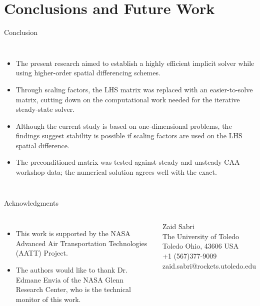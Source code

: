 \section{Conclusions and Future Work}
\begin{frame}{Conclusion}
  \begin{columns}
    \begin{itemize}
      \item The present research aimed to establish a highly efficient implicit solver while
        using higher-order spatial differencing schemes. 
      \item Through scaling factors, the LHS matrix was replaced with an easier-to-solve matrix,
        cutting down on the computational work needed for the iterative steady-state solver. 
      \item Although the current study is based on one-dimensional problems, the findings
        suggest stability is possible if scaling factors are used on the LHS spatial difference.
      \item The preconditioned matrix was tested against steady and unsteady CAA workshop data;
        the numerical solution agrees well with the exact.  
    \end{itemize}
  \end{columns}
\end{frame}

\begin{frame}{Acknowledgments}
  \begin{columns}
        \begin{itemize}
        \item This work is supported by the NASA Advanced Air Transportation Technologies (AATT)
          Project. 
        \item The authors would like to thank Dr. Edmane Envia of the NASA Glenn Research Center,
          who is the technical monitor of this work.
        \end{itemize}
        \begin{block}{}
        	Zaid Sabri \\
        	The University of Toledo \\
        	Toledo Ohio, 43606 USA \\
        	+1 (567)377-9009 \\
        	zaid.sabri@rockets.utoledo.edu
        \end{block}
  \end{columns}
\end{frame} 
    

